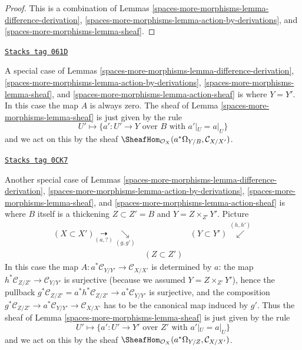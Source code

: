 \begin{proof}
This is a combination of
Lemmas \ref{spaces-more-morphisms-lemma-difference-derivation},
\ref{spaces-more-morphisms-lemma-action-by-derivations},
and \ref{spaces-more-morphisms-lemma-sheaf}.
\end{proof}

\begin{remark}
\label{spaces-more-morphisms-remark-special-case}
\href{https://stacks.math.columbia.edu/tag/061D}{\texttt{Stacks tag 061D}}

A special case of
Lemmas \ref{spaces-more-morphisms-lemma-difference-derivation},
\ref{spaces-more-morphisms-lemma-action-by-derivations},
\ref{spaces-more-morphisms-lemma-sheaf}, and
\ref{spaces-more-morphisms-lemma-action-sheaf}
is where $Y = Y'$. In this case the map $A$ is always zero.
The sheaf of
Lemma \ref{spaces-more-morphisms-lemma-sheaf}
is just given by the rule
$$
U' \mapsto
\{a' : U' \to Y\text{ over }B\text{ with } a'|_U = a|_U\}
$$
and we act on this by the sheaf
$\SheafHom_{\mathcal{O}_X}(a^*\Omega_{Y/B}, \mathcal{C}_{X/X'})$.
\end{remark}

\begin{remark}
\label{spaces-more-morphisms-remark-another-special-case}
\href{https://stacks.math.columbia.edu/tag/0CK7}{\texttt{Stacks tag 0CK7}}

Another special case of
Lemmas \ref{spaces-more-morphisms-lemma-difference-derivation},
\ref{spaces-more-morphisms-lemma-action-by-derivations},
\ref{spaces-more-morphisms-lemma-sheaf}, and
\ref{spaces-more-morphisms-lemma-action-sheaf}
is where $B$ itself is a thickening $Z \subset Z' = B$
and $Y = Z \times_{Z'} Y'$. Picture
$$
\begin{array}{ccc}(X \subset X') \underset{(a, ?)}{\dashrightarrow}\underset{(g, g')}{\searrow} &  & (Y \subset Y') \overset{(h, h')}{\swarrow} \\  & (Z \subset Z') & \end{array}
$$
In this case the map $A : a^*\mathcal{C}_{Y/Y'} \to \mathcal{C}_{X/X'}$
is determined by $a$: the map
$h^*\mathcal{C}_{Z/Z'} \to \mathcal{C}_{Y/Y'}$ is surjective (because we
assumed $Y = Z \times_{Z'} Y'$), hence the pullback
$g^*\mathcal{C}_{Z/Z'} = a^*h^*\mathcal{C}_{Z/Z'} \to
a^*\mathcal{C}_{Y/Y'}$ is surjective, and the composition
$g^*\mathcal{C}_{Z/Z'} \to a^*\mathcal{C}_{Y/Y'} \to \mathcal{C}_{X/X'}$
has to be the canonical map induced by $g'$. Thus the sheaf of
Lemma \ref{spaces-more-morphisms-lemma-sheaf}
is just given by the rule
$$
U' \mapsto
\{a' : U' \to Y'\text{ over }Z'\text{ with } a'|_U = a|_U\}
$$
and we act on this by the sheaf
$\SheafHom_{\mathcal{O}_X}(a^*\Omega_{Y/Z}, \mathcal{C}_{X/X'})$.
\end{remark}

